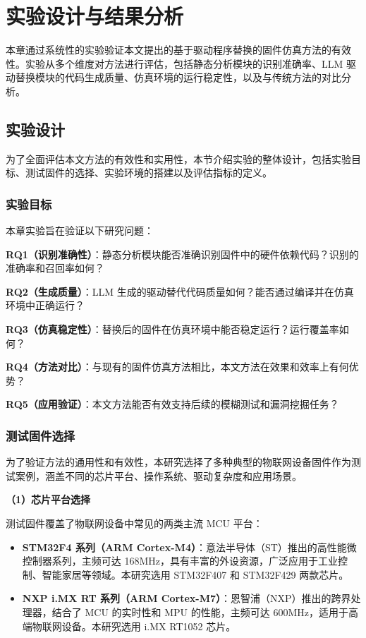 \chapter{实验设计与结果分析}
\label{chap:exp}

本章通过系统性的实验验证本文提出的基于驱动程序替换的固件仿真方法的有效性。实验从多个维度对方法进行评估，包括静态分析模块的识别准确率、LLM 驱动替换模块的代码生成质量、仿真环境的运行稳定性，以及与传统方法的对比分析。

\section{实验设计}
\label{sec:design}

为了全面评估本文方法的有效性和实用性，本节介绍实验的整体设计，包括实验目标、测试固件的选择、实验环境的搭建以及评估指标的定义。

\subsection{实验目标}

本章实验旨在验证以下研究问题：

\textbf{RQ1（识别准确性）}：静态分析模块能否准确识别固件中的硬件依赖代码？识别的准确率和召回率如何？

\textbf{RQ2（生成质量）}：LLM 生成的驱动替代代码质量如何？能否通过编译并在仿真环境中正确运行？

\textbf{RQ3（仿真稳定性）}：替换后的固件在仿真环境中能否稳定运行？运行覆盖率如何？

\textbf{RQ4（方法对比）}：与现有的固件仿真方法相比，本文方法在效果和效率上有何优势？

\textbf{RQ5（应用验证）}：本文方法能否有效支持后续的模糊测试和漏洞挖掘任务？

\subsection{测试固件选择}

为了验证方法的通用性和有效性，本研究选择了多种典型的物联网设备固件作为测试案例，涵盖不同的芯片平台、操作系统、驱动复杂度和应用场景。

\textbf{（1）芯片平台选择}

测试固件覆盖了物联网设备中常见的两类主流 MCU 平台：

\begin{itemize}
    \item \textbf{STM32F4 系列（ARM Cortex-M4）}：意法半导体（ST）推出的高性能微控制器系列，主频可达 168MHz，具有丰富的外设资源，广泛应用于工业控制、智能家居等领域。本研究选用 STM32F407 和 STM32F429 两款芯片。
    \item \textbf{NXP i.MX RT 系列（ARM Cortex-M7）}：恩智浦（NXP）推出的跨界处理器，结合了 MCU 的实时性和 MPU 的性能，主频可达 600MHz，适用于高端物联网设备。本研究选用 i.MX RT1052 芯片。
\end{itemize}

